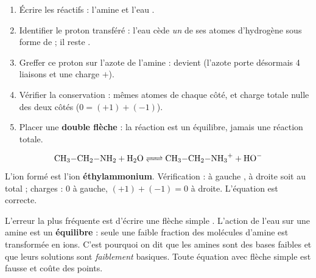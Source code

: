 \documentclass[11pt]{article}
\newcommand{\cle}[1]{{\popxbold\color{popdark}#1}}
\begin{document}
\begin{methode}
\begin{enumerate}
  \item Écrire les réactifs : l'amine  et l'eau .
  \item Identifier le proton transféré : l'eau cède \emph{un} de ses atomes d'hydrogène sous forme de  ; il reste .
  \item Greffer ce proton sur l'azote de l'amine :  devient  (l'azote porte désormais 4 liaisons et une charge $+$).
  \item Vérifier la conservation : mêmes atomes de chaque côté, et charge totale nulle des deux côtés ($0 = (+1) + (-1)$).
  \item Placer une \textbf{double flèche} \ce{<=>} : la réaction est un équilibre, jamais une réaction totale.
\end{enumerate}
\end{methode}

\begin{exemplebox}
\[ \ce{CH3-CH2-NH2 + H2O <=> CH3-CH2-NH3+ + HO-} \]
L'ion formé est l'ion \textbf{éthylammonium}. Vérification : à gauche , à droite  soit  au total ; charges : $0$ à gauche, $(+1)+(-1)=0$ à droite. L'équation est correcte.
\end{exemplebox}

\begin{attention}
L'erreur la plus fréquente est d'écrire une flèche simple \ce{->}. L'action de l'eau sur une amine est un \textbf{équilibre} : seule une faible fraction des molécules d'amine est transformée en ions. C'est pourquoi on dit que les amines sont des \cle{bases faibles} et que leurs solutions sont \emph{faiblement} basiques. Toute équation  avec flèche simple est fausse et coûte des points.
\end{attention}
\end{document}
